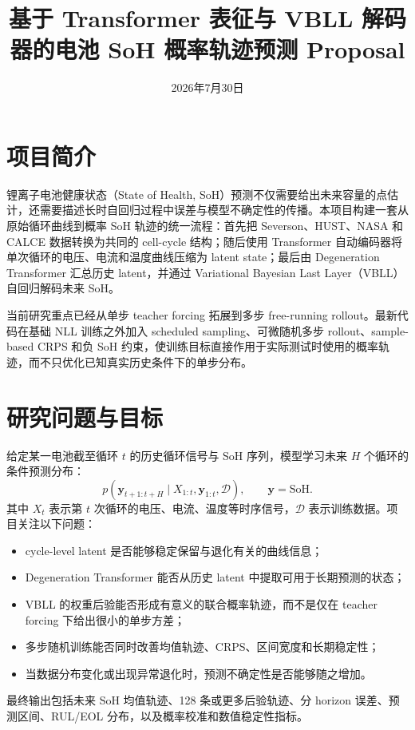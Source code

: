 \documentclass[11pt,a4paper,fontset=none]{ctexart}
\title{\textbf{基于 Transformer 表征与 VBLL 解码器的电池 SoH 概率轨迹预测 Proposal}}
\author{}
\date{2026年7月30日}
\begin{document}
\maketitle

\section{项目简介}

锂离子电池健康状态（State of Health, SoH）预测不仅需要给出未来容量的点估计，还需要描述长时自回归过程中误差与模型不确定性的传播。本项目构建一套从原始循环曲线到概率 SoH 轨迹的统一流程：首先把 Severson、HUST、NASA 和 CALCE 数据转换为共同的 cell-cycle 结构；随后使用 Transformer 自动编码器将单次循环的电压、电流和温度曲线压缩为 latent state；最后由 Degeneration Transformer 汇总历史 latent，并通过 Variational Bayesian Last Layer（VBLL）自回归解码未来 SoH。

当前研究重点已经从单步 teacher forcing 拓展到多步 free-running rollout。最新代码在基础 NLL 训练之外加入 scheduled sampling、可微随机多步 rollout、sample-based CRPS 和负 SoH 约束，使训练目标直接作用于实际测试时使用的概率轨迹，而不只优化已知真实历史条件下的单步分布。

\section{研究问题与目标}

给定某一电池截至循环 $t$ 的历史循环信号与 SoH 序列，模型学习未来 $H$ 个循环的条件预测分布：
\[
p(\mathbf y_{t+1:t+H}\mid X_{1:t},\mathbf y_{1:t},\mathcal D),
\qquad \mathbf y=\mathrm{SoH}.
\]
其中 $X_t$ 表示第 $t$ 次循环的电压、电流、温度等时序信号，$\mathcal D$ 表示训练数据。项目关注以下问题：
\begin{itemize}
  \item cycle-level latent 是否能够稳定保留与退化有关的曲线信息；
  \item Degeneration Transformer 能否从历史 latent 中提取可用于长期预测的状态；
  \item VBLL 的权重后验能否形成有意义的联合概率轨迹，而不是仅在 teacher forcing 下给出很小的单步方差；
  \item 多步随机训练能否同时改善均值轨迹、CRPS、区间宽度和长期稳定性；
  \item 当数据分布变化或出现异常退化时，预测不确定性是否能够随之增加。
\end{itemize}

最终输出包括未来 SoH 均值轨迹、128 条或更多后验轨迹、分 horizon 误差、预测区间、RUL/EOL 分布，以及概率校准和数值稳定性指标。
\end{document}
